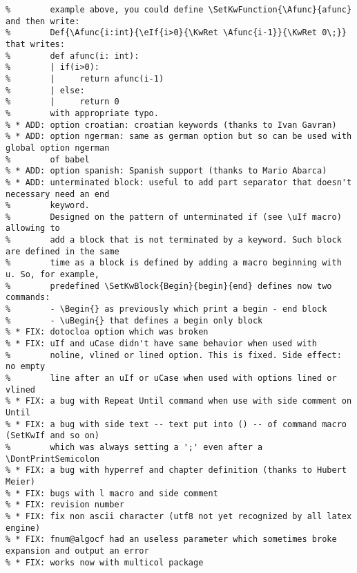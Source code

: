 \documentclass[a4paper]{article}
\begin{document}
\begin{verbatim}
%        example above, you could define \SetKwFunction{\Afunc}{afunc} and then write:
%        Def{\Afunc{i:int}{\eIf{i>0}{\KwRet \Afunc{i-1}}{\KwRet 0\;}} that writes:
%        def afunc(i: int):
%        | if(i>0):
%        |     return afunc(i-1)
%        | else:
%        |     return 0
%        with appropriate typo.
% * ADD: option croatian: croatian keywords (thanks to Ivan Gavran)
% * ADD: option ngerman: same as german option but so can be used with global option ngerman
%        of babel
% * ADD: option spanish: Spanish support (thanks to Mario Abarca)
% * ADD: unterminated block: useful to add part separator that doesn't necessary need an end
%        keyword.  
%        Designed on the pattern of unterminated if (see \uIf macro) allowing to
%        add a block that is not terminated by a keyword. Such block are defined in the same
%        time as a block is defined by adding a macro beginning with u. So, for example,
%        predefined \SetKwBlock{Begin}{begin}{end} defines now two commands:
%        - \Begin{} as previously which print a begin - end block
%        - \uBegin{} that defines a begin only block
% * FIX: dotocloa option which was broken
% * FIX: uIf and uCase didn't have same behavior when used with
%        noline, vlined or lined option. This is fixed. Side effect: no empty
%        line after an uIf or uCase when used with options lined or vlined
% * FIX: a bug with Repeat Until command when use with side comment on Until
% * FIX: a bug with side text -- text put into () -- of command macro (SetKwIf and so on)
%        which was always setting a ';' even after a \DontPrintSemicolon
% * FIX: a bug with hyperref and chapter definition (thanks to Hubert Meier)
% * FIX: bugs with l macro and side comment
% * FIX: revision number
% * FIX: fix non ascii character (utf8 not yet recognized by all latex engine)
% * FIX: fnum@algocf had an useless parameter which sometimes broke expansion and output an error
% * FIX: works now with multicol package
\end{verbatim}

\clearpage
\listofalgorithms
\clearpage
\printindex
\end{document}

